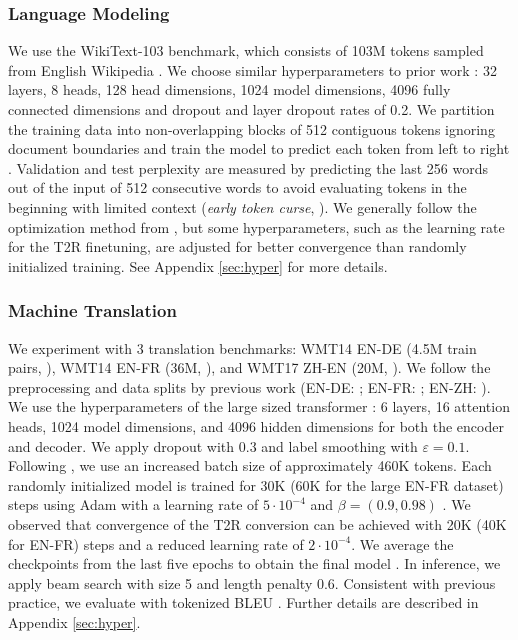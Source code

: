 \documentclass[11pt]{article}
\newcommand{\TRNN}{T2R\xspace}
\begin{document}
\subsubsection{Language Modeling}
We use the WikiText-103 benchmark, which consists of 103M tokens sampled from English Wikipedia \cite{wiki103}.
We choose similar hyperparameters to prior work \cite{Baevski2019AdaptiveIR, layerdrop}: 32 layers, 8 heads, 128 head dimensions, 1024 model dimensions, 4096 fully connected dimensions and dropout \cite{dropout} and layer dropout rates of 0.2.
We partition the training data into non-overlapping blocks of 512 contiguous tokens ignoring document boundaries and train the model to predict each token from left to right \cite{Baevski2019AdaptiveIR}.
Validation and test perplexity are measured by predicting the last 256 words out of the input of 512 consecutive words to avoid evaluating tokens in the beginning with limited context (\textit{early token curse}, \citealp{shortformer}).
We generally follow the optimization method from \citet{Baevski2019AdaptiveIR}, but some hyperparameters, such as the learning rate for the \TRNN finetuning, are adjusted for better convergence than randomly initialized training.
See Appendix \ref{sec:hyper} for more details.



\subsubsection{Machine Translation}
We experiment with 3 translation benchmarks: WMT14 EN-DE (4.5M train pairs, \citealp{wmt2016-findings}), WMT14 EN-FR (36M, \citealp{wmt2014-findings}), and WMT17 ZH-EN (20M, \citealp{wmt2017-findings}).
We follow the preprocessing and data splits by previous work (EN-DE: \citealp{Vaswani2017AttentionIA}; EN-FR: \citealp{Gehring2017ConvolutionalST}; EN-ZH: \citealp{Hassan2018AchievingHP}).
We use the hyperparameters of the large sized transformer \cite{Vaswani2017AttentionIA}: 6 layers, 16 attention heads, 1024 model dimensions, and 4096 hidden dimensions for both the encoder and decoder.
We apply dropout with $0.3$ and label smoothing with $\varepsilon=0.1$.
Following \citet{Ott2018ScalingNM}, we use an increased batch size of approximately 460K tokens.
Each randomly initialized model is trained for 30K (60K for the large EN-FR dataset) steps using Adam with a learning rate of $5\cdot10^{-4}$ and $\beta=(0.9, 0.98)$ \cite{Kingma2014AdamAM}.
We observed that convergence of the \TRNN conversion can be achieved with 20K (40K for EN-FR) steps and a reduced learning rate of $2\cdot10^{-4}$.
We average the checkpoints from the last five epochs to obtain the final model \cite{Vaswani2017AttentionIA}.
In inference, we apply beam search with size 5 and length penalty 0.6.
Consistent with previous practice, we evaluate with tokenized BLEU \cite{Papineni2001BleuAM}.
Further details are described in Appendix \ref{sec:hyper}.
\end{document}
